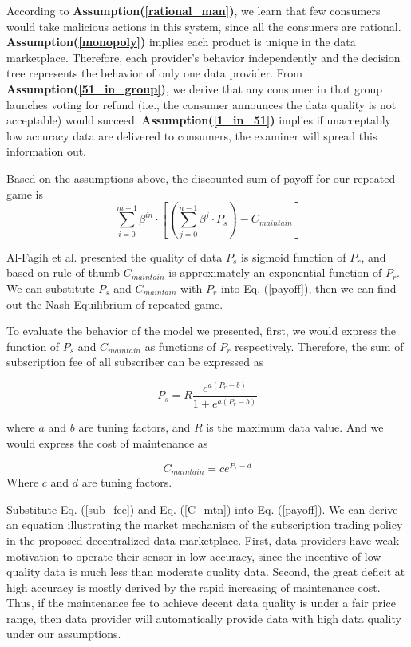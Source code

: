 \documentclass[journal,10pt,a4paper]{IEEEtran}
\begin{document}
According to \textbf{Assumption(\ref{rational_man})}, we learn that few consumers would take malicious actions in this system, since all the consumers are rational. \textbf{Assumption(\ref{monopoly})} implies each product is unique in the data marketplace. Therefore, each provider's behavior independently and the decision tree represents the behavior of only one data provider. From \textbf{Assumption(\ref{51_in_group})}, we derive that any consumer in that group launches voting for refund (i.e., the consumer announces the data quality is not acceptable) would succeed. \textbf{Assumption(\ref{1_in_51})}  implies if unacceptably low accuracy data are delivered to consumers, the examiner will spread this information out.


Based on the assumptions above, the discounted sum of payoff for our repeated game is
\begin{equation} \label{payoff}
    \sum_{i=0}^{m - 1}{\beta^{in}\cdot [(\sum_{j=0}^{n - 1} \beta^j \cdot P_s) - C_{maintain}]}
\end{equation}

Al-Fagih et al. presented\cite{DataPrice} the quality of data $P_s$ is sigmoid function of $P_r$, and based on rule of thumb $C_{maintain}$ is approximately an exponential function of $P_r$. We can substitute $P_s$ and $C_{maintain}$ with $P_r$ into Eq. (\ref{payoff}), then we can find out the Nash Equilibrium of repeated game.

To evaluate the behavior of the model we presented, first, we would express the function of $P_s$ and $C_{maintain}$ as functions of $P_r$ respectively. Therefore, the sum of subscription fee of all subscriber can be expressed as

\begin{equation} \label{sub_fee}
    P_s = R \frac{e^{a (P_r - b)}}{1 + e^{a (P_r - b)}}
\end{equation}

where $a$ and $b$ are tuning factors, and $R$ is the maximum data value.
And we would express the cost of maintenance as

\begin{equation} \label{C_mtn}
    C_{maintain} = ce^{P_r - d}
\end{equation}
Where $c$ and $d$ are tuning factors.

Substitute Eq. (\ref{sub_fee}) and Eq. (\ref{C_mtn}) into Eq. (\ref{payoff}). We can derive an equation illustrating the market mechanism of the subscription trading policy in the proposed decentralized data marketplace. First, data providers have weak motivation to operate their sensor in low accuracy, since the incentive of low quality data is much less than moderate quality data. Second, the great deficit at high accuracy is mostly derived by the rapid increasing of maintenance cost. Thus, if the maintenance fee to achieve decent data quality is under a fair price range, then data provider will automatically provide data with high data quality under our assumptions.
\end{document}
